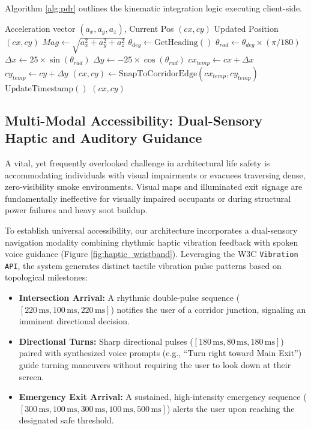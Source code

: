 \documentclass[conference]{IEEEtran}
\begin{document}
Algorithm \ref{alg:pdr} outlines the kinematic integration logic executing client-side.

\begin{algorithm}[htbp]
\caption{Kinematic PDR and Map Snapping}\label{alg:pdr}
\begin{algorithmic}[1]
\REQUIRE Acceleration vector $(a_x, a_y, a_z)$, Current Pos $(cx, cy)$
\ENSURE Updated Position $(cx, cy)$
\STATE $Mag \leftarrow \sqrt{a_x^2 + a_y^2 + a_z^2}$
    \STATE $\theta_{deg} \leftarrow \text{GetHeading}()$
    \STATE $\theta_{rad} \leftarrow \theta_{deg} \times (\pi / 180)$
    \STATE $\Delta x \leftarrow 25 \times \sin(\theta_{rad})$
    \STATE $\Delta y \leftarrow -25 \times \cos(\theta_{rad})$
    \STATE $cx_{temp} \leftarrow cx + \Delta x$
    \STATE $cy_{temp} \leftarrow cy + \Delta y$
    \STATE $(cx, cy) \leftarrow \text{SnapToCorridorEdge}(cx_{temp}, cy_{temp})$
    \STATE $\text{UpdateTimestamp}()$
\ENDIF
\RETURN $(cx, cy)$
\end{algorithmic}
\end{algorithm}

\subsection{Multi-Modal Accessibility: Dual-Sensory Haptic and Auditory Guidance}
A vital, yet frequently overlooked challenge in architectural life safety is accommodating individuals with visual impairments or evacuees traversing dense, zero-visibility smoke environments. Visual maps and illuminated exit signage are fundamentally ineffective for visually impaired occupants or during structural power failures and heavy soot buildup.

To establish universal accessibility, our architecture incorporates a dual-sensory navigation modality combining rhythmic haptic vibration feedback with spoken voice guidance (Figure \ref{fig:haptic_wristband}). Leveraging the W3C \texttt{Vibration API}, the system generates distinct tactile vibration pulse patterns based on topological milestones:
\begin{itemize}
    \item \textbf{Intersection Arrival:} A rhythmic double-pulse sequence ($[220\,\text{ms}, 100\,\text{ms}, 220\,\text{ms}]$) notifies the user of a corridor junction, signaling an imminent directional decision.
    \item \textbf{Directional Turns:} Sharp directional pulses ($[180\,\text{ms}, 80\,\text{ms}, 180\,\text{ms}]$) paired with synthesized voice prompts (e.g., ``Turn right toward Main Exit'') guide turning maneuvers without requiring the user to look down at their screen.
    \item \textbf{Emergency Exit Arrival:} A sustained, high-intensity emergency sequence ($[300\,\text{ms}, 100\,\text{ms}, 300\,\text{ms}, 100\,\text{ms}, 500\,\text{ms}]$) alerts the user upon reaching the designated safe threshold.
\end{itemize}
\end{document}
